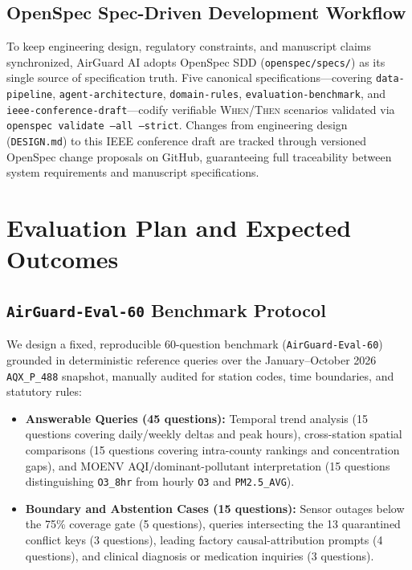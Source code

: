 \documentclass[conference]{IEEEtran}
\begin{document}
\subsection{OpenSpec Spec-Driven Development Workflow}
To keep engineering design, regulatory constraints, and manuscript claims synchronized, AirGuard AI adopts OpenSpec SDD (\texttt{openspec/specs/}) as its single source of specification truth. Five canonical specifications---covering \texttt{data-pipeline}, \texttt{agent-architecture}, \texttt{domain-rules}, \texttt{evaluation-benchmark}, and \texttt{ieee-conference-draft}---codify verifiable \textsc{When/Then} scenarios validated via \texttt{openspec validate --all --strict}. Changes from engineering design (\texttt{DESIGN.md}) to this IEEE conference draft are tracked through versioned OpenSpec change proposals on GitHub, guaranteeing full traceability between system requirements and manuscript specifications.

\section{Evaluation Plan and Expected Outcomes}
\subsection{\texttt{AirGuard-Eval-60} Benchmark Protocol}
We design a fixed, reproducible 60-question benchmark (\texttt{AirGuard-Eval-60}) grounded in deterministic reference queries over the January--October 2026 \texttt{AQX\_P\_488} snapshot, manually audited for station codes, time boundaries, and statutory rules:
\begin{itemize}
    \item \textbf{Answerable Queries (45 questions):} Temporal trend analysis (15 questions covering daily/weekly deltas and peak hours), cross-station spatial comparisons (15 questions covering intra-county rankings and concentration gaps), and MOENV AQI/dominant-pollutant interpretation (15 questions distinguishing \texttt{O3\_8hr} from hourly \texttt{O3} and \texttt{PM2.5\_AVG}).
    \item \textbf{Boundary and Abstention Cases (15 questions):} Sensor outages below the 75\% coverage gate (5 questions), queries intersecting the 13 quarantined conflict keys (3 questions), leading factory causal-attribution prompts (4 questions), and clinical diagnosis or medication inquiries (3 questions).
\end{itemize}
\end{document}
